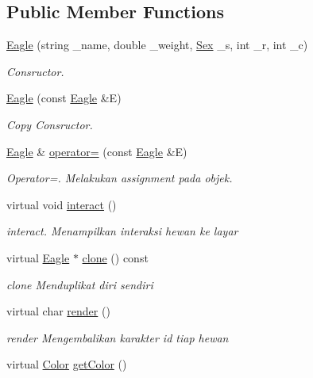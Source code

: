 \subsection*{Public Member Functions}
\begin{DoxyCompactItemize}
\item 
\hyperlink{classEagle_aae9a6a5e49f7eb52e598ad9671973cd1}{Eagle} (string \+\_\+name, double \+\_\+weight, \hyperlink{sex_8h_a2633cb393c68bb2ee8080db58fb7ba93}{Sex} \+\_\+s, int \+\_\+r, int \+\_\+c)
\begin{DoxyCompactList}\small\item\em Consructor. \end{DoxyCompactList}\item 
\hyperlink{classEagle_a7255de3683837e66642f9969b06a2c0c}{Eagle} (const \hyperlink{classEagle}{Eagle} \&E)
\begin{DoxyCompactList}\small\item\em Copy Consructor. \end{DoxyCompactList}\item 
\hyperlink{classEagle}{Eagle} \& \hyperlink{classEagle_a26fa818d2c6168304fe6eb7fd80b5ab7}{operator=} (const \hyperlink{classEagle}{Eagle} \&E)
\begin{DoxyCompactList}\small\item\em Operator=. Melakukan assignment pada objek. \end{DoxyCompactList}\item 
virtual void \hyperlink{classEagle_aa47ed62d92f1b2f9bad339b8521a50f6}{interact} ()
\begin{DoxyCompactList}\small\item\em interact. Menampilkan interaksi hewan ke layar \end{DoxyCompactList}\item 
virtual \hyperlink{classEagle}{Eagle} $\ast$ \hyperlink{classEagle_a8b6f062eccca508c551b27c1581e7d83}{clone} () const 
\begin{DoxyCompactList}\small\item\em clone Menduplikat diri sendiri \end{DoxyCompactList}\item 
virtual char \hyperlink{classEagle_a1a97b6a2a2dbe76a6ddf3dc15e5f36d4}{render} ()
\begin{DoxyCompactList}\small\item\em render Mengembalikan karakter id tiap hewan \end{DoxyCompactList}\item 
virtual \hyperlink{color_8h_ab87bacfdad76e61b9412d7124be44c1c}{Color} \hyperlink{classEagle_ac70f5c248aca36e5c3b7f64160bc139d}{get\+Color} ()

\end{DoxyCompactItemize}

